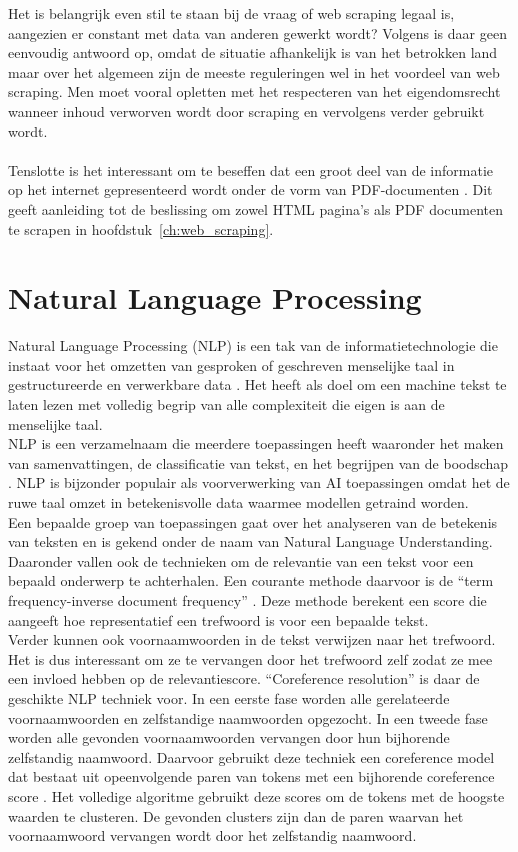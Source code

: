 Het is belangrijk even stil te staan bij de vraag of web scraping legaal is, aangezien er constant met data van anderen gewerkt wordt? Volgens \textcite{EPSI2015} is daar geen eenvoudig antwoord op, omdat de situatie afhankelijk is van het betrokken land maar over het algemeen zijn de meeste reguleringen wel in het voordeel van web scraping. Men moet vooral opletten met het respecteren van het eigendomsrecht wanneer inhoud verworven wordt door scraping en vervolgens verder gebruikt wordt.\\\\
Tenslotte is het interessant om te beseffen dat een groot deel van de informatie op het internet gepresenteerd wordt onder de vorm van PDF-documenten \autocite{Singrodia2019}. Dit geeft aanleiding tot de beslissing om zowel HTML pagina's als PDF documenten te scrapen in hoofdstuk~\ref{ch:web_scraping}.\\
\section{Natural Language Processing}
Natural Language Processing (NLP) is een tak van de informatietechnologie die instaat voor het omzetten van gesproken of geschreven menselijke taal in gestructureerde en verwerkbare data \autocite{Fanni2023}.
Het heeft als doel om een machine tekst te laten lezen met volledig begrip van alle complexiteit die eigen is aan de menselijke taal.\\
NLP is een verzamelnaam die meerdere toepassingen heeft waaronder het maken van samenvattingen, de classificatie van tekst, en het begrijpen van de boodschap \autocite{Khurana2022}. NLP is bijzonder populair als voorverwerking van AI toepassingen omdat het de ruwe taal omzet in betekenisvolle data waarmee modellen getraind worden.\\
Een bepaalde groep van toepassingen gaat over het analyseren van de betekenis van teksten en is gekend onder de naam van Natural Language Understanding. Daaronder vallen ook de technieken om de relevantie van een tekst voor een bepaald onderwerp te achterhalen. Een courante methode daarvoor is de ``term frequency-inverse document frequency'' \autocite{Havrlant2017}. Deze methode berekent een score die aangeeft hoe representatief een trefwoord is voor een bepaalde tekst.\\
Verder kunnen ook voornaamwoorden in de tekst verwijzen naar het trefwoord. Het is dus interessant om ze te vervangen door het trefwoord zelf zodat ze mee een invloed hebben op de relevantiescore. ``Coreference resolution'' is daar de geschikte NLP techniek voor. In een eerste fase worden alle gerelateerde voornaamwoorden en zelfstandige naamwoorden opgezocht. In een tweede fase worden alle gevonden voornaamwoorden vervangen door hun bijhorende zelfstandig naamwoord. Daarvoor gebruikt deze techniek een coreference model dat bestaat uit opeenvolgende paren van tokens met een bijhorende coreference score \autocite{Lee2017}. Het volledige algoritme \autocite{Explosion2025} gebruikt deze scores om de tokens met de hoogste waarden te clusteren. De gevonden clusters zijn dan de paren waarvan het voornaamwoord vervangen wordt door het zelfstandig naamwoord.

